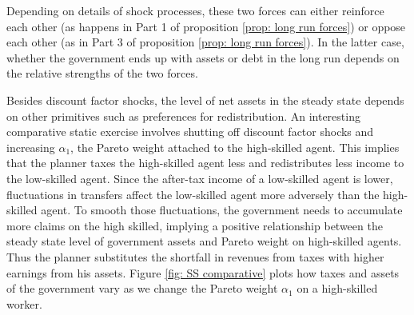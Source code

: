 \documentclass[thmsb,11pt]{article}
\begin{document}

Depending on  details of shock processes, these two forces can
either reinforce each other (as happens in Part 1 of  proposition \ref{prop: long run forces}) or oppose each other (as in Part 3 of  proposition \ref{prop: long run forces}). In the latter case, whether the
government ends up with assets or debt in the long run depends on the
relative strengths of the two forces.


 Besides discount factor shocks, the level of net assets in the steady state depends on other primitives such as preferences for redistribution. An interesting comparative static exercise involves shutting off discount factor shocks and increasing  $\alpha_1$, the Pareto weight attached to the high-skilled agent. This implies that the planner taxes  the high-skilled agent less and redistributes less income to the low-skilled agent. Since the after-tax income of a low-skilled agent is lower,  fluctuations in transfers affect the low-skilled agent more adversely than the high-skilled
 agent. To smooth those fluctuations, the government needs to accumulate more claims on the high skilled, implying a positive relationship between the steady state level of government assets and Pareto weight on high-skilled agents. Thus the planner substitutes the shortfall in revenues from taxes with higher earnings from his assets. Figure \ref{fig: SS comparative} plots how taxes and assets of the government vary as we change the Pareto weight  $\alpha_1$ on a high-skilled worker.


%
%
\end{document}
